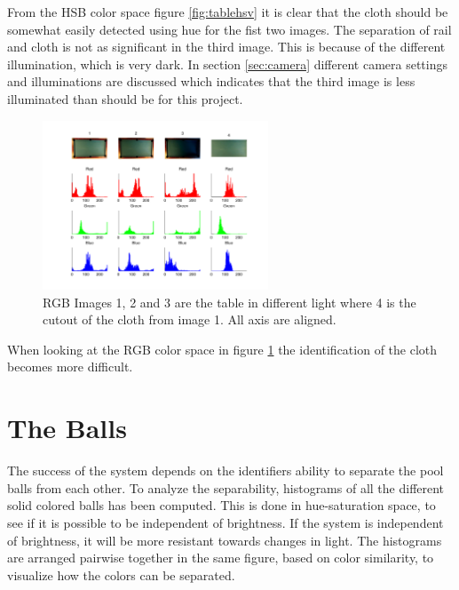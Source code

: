 From the HSB color space figure \ref{fig:tablehsv} it is clear that the cloth should be somewhat easily detected using hue for the fist two images. The separation of rail and cloth is not as significant in the third image. This is because of the different illumination, which is very dark. In section \ref{sec:camera} different camera settings and illuminations are discussed which indicates that the third image is less illuminated than should be for this project.
\begin{figure}[H]
\begin{center}
\leavevmode
\includegraphics[width=0.6\textwidth]{images/rgb_hist_table}
\end{center}
\caption{RGB Images 1, 2 and 3 are the table in different light where 4 is the cutout of the cloth from image 1. All axis are aligned.}
\label{fig:tablergb}
\end{figure}
When looking at the RGB color space in figure \ref{fig:tablergb} the identification of the cloth becomes more difficult.

\section{The Balls}
\label{sec:analballs}
The success of the system depends on the identifiers ability to separate the pool balls from each other. To analyze the separability, histograms of all the different solid colored balls has been computed. This is done in hue-saturation space, to see if it is possible to be independent of brightness. If the system is independent of brightness, it will be more resistant towards changes in light. The histograms are arranged pairwise together in the same figure, based on color similarity, to visualize how the colors can be separated.

